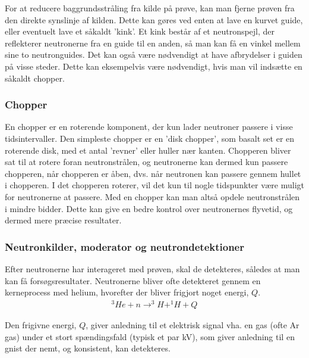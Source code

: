 \documentclass[12pt,oneside,a4paper]{article}
\begin{document}
{{{{{For at reducere baggrundsstråling fra kilde på prøve, kan man fjerne prøven fra den direkte synslinje af kilden. Dette kan gøres ved enten at lave en kurvet guide, eller eventuelt lave et såkaldt 'kink'. Et kink består af et neutronspejl, der reflekterer neutronerne fra en guide til en anden, så man kan få en vinkel mellem sine to neutronguides. 
Det kan også være nødvendigt at have afbrydelser i guiden på visse steder. Dette kan eksempelvis være nødvendigt, hvis man vil indsætte en såkaldt chopper.

\subsubsection{Chopper}
En chopper er en roterende komponent, der kun lader neutroner passere i visse tidsintervaller. Den simpleste chopper er en 'disk chopper', som basalt set er en roterende disk, med et antal 'revner' eller huller nær kanten. Chopperen bliver sat til at rotere foran neutronstrålen, og neutronerne kan dermed kun passere chopperen, når chopperen er åben, dvs. når neutronen kan passere gennem hullet i chopperen. I det chopperen roterer, vil det kun til nogle tidspunkter være muligt for neutronerne at passere. Med en chopper kan man altså opdele neutronstrålen i mindre bidder. Dette kan give en bedre kontrol over neutronernes flyvetid, og dermed mere præcise resultater. \cite{ess_folder}

\subsubsection{Neutronkilder, moderator og neutrondetektioner}
Efter neutronerne har interageret med prøven, skal de detekteres, således at man kan få forsøgsresultater. Neutronerne 
bliver ofte detekteret gennem en kerneprocess med helium, hvorefter der bliver frigjort noget energi, $Q$. \cite{lefmann_arleth_kirkensgaard_lebech_thomsen}
\begin{align}
^3He + n \to  ^3H + ^1H + Q
\end{align}

Den frigivne energi, $Q$, giver anledning til et elektrisk signal vha. en gas (ofte Ar gas) under et stort spændingsfald (typisk et par kV), som giver anledning til en gnist der nemt, og konsistent, kan detekteres.

}}}}}
\end{document}

